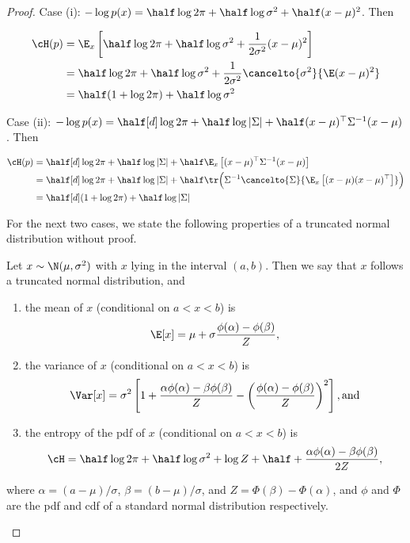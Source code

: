 \begin{proof}
\hspace{1cm}

Case (i): $-\log p(x) = \half\log 2\pi + \half\log \sigma^2 + \half(x - \mu)^2$. Then 

\begin{align*}
  \cH(p) &= \E_x\left[\half\log 2\pi + \half\log \sigma^2 + \frac{1}{2\sigma^2}(x - \mu)^2\right] \\
  &= \half\log 2\pi + \half\log \sigma^2 + \frac{1}{2\sigma^2} \cancelto{\sigma^2}{\E (x - \mu)^2} \\
  &= \half (1 + \log 2\pi) + \half \log \sigma^2
\end{align*}

Case (ii): $-\log p(x) = \half[d]\log 2\pi + \half\log \vert \Sigma \vert+ \half(x - \mu)^\top\Sigma^{-1}(x - \mu)$. Then

\begin{align*}
  \cH(p) &= \half[d]\log 2\pi + \half\log \vert \Sigma \vert + \half \E_x \left[ (x - \mu)^\top\Sigma^{-1}(x - \mu) \right] \\
  &= \half[d]\log 2\pi + \half\log \vert \Sigma \vert + \half \tr \Big(\Sigma^{-1} \cancelto{\Sigma}{\E_x \left[ (x - \mu)(x - \mu)^\top \right]} \Big) \\
  &= \half[d] (1 + \log 2\pi) + \half\log \vert \Sigma \vert 
\end{align*}

For the next two cases, we state the following properties of a truncated normal distribution without proof.
\begin{lemma}\label{thm:entropytruncatednormal}
    Let $x \sim \N(\mu,\sigma^2)$ with $x$ lying in the interval $(a,b)$. Then we say that $x$ follows a truncated normal distribution, and
    \begin{enumerate}[label=(\roman*)]
      \item the mean of $x$ (conditional on $a<x<b$) is
      \[
        \E[x] = \mu + \sigma\frac{\phi(\alpha) - \phi(\beta)}{Z},
      \]
      \item the variance of $x$ (conditional on $a<x<b$) is
      \[
        \Var[x] = \sigma^2\left[1 + \frac{\alpha\phi(\alpha) - \beta\phi(\beta)}{Z} - \left( \frac{\phi(\alpha) - \phi(\beta)}{Z}\right)^2 \right], \text{and}
      \]
      \item the entropy of the pdf of $x$ (conditional on $a<x<b$) is
      \[
        \cH = \half \log 2\pi + \half \log \sigma^2 + \log Z  + \half + 
        \frac{\alpha\phi(\alpha) - \beta\phi(\beta)}{2Z},
      \]
    \end{enumerate}
    where $\alpha = (a - \mu)/\sigma$, $\beta = (b - \mu)/\sigma$, and $Z = \Phi(\beta) - \Phi(\alpha)$, and $\phi$ and $\Phi$ are the pdf and cdf of a standard normal distribution respectively.
\end{lemma}


\end{proof}
